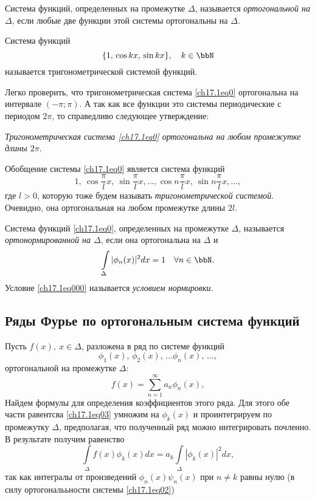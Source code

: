 \begin{defn}
Система функций, определенных на промежутке $\Delta$, называется \textit{ортогональной на $\Delta$}, если любые две функции этой системы ортогональны на $\Delta$.
\end{defn}

\begin{defn}
Система функций 
\begin{equation} \label{ch17.1eq0}
\{1,\, \cos kx,\, \sin kx\}, \quad k\in \bbN
\end{equation}
называется тригонометрической системой функций.			
\end{defn}
Легко проверить, что тригонометрическая система \eqref{ch17.1eq0} ортогональна на интервале $(-\pi;\pi)$. А так как все функции это системы периодические с периодом $2\pi$, то справедливо следующее утверждение:

\textit{Тригонометрическая система \eqref{ch17.1eq0} ортогональна на любом промежутке длины $2\pi$}.	

Обобщение системы \eqref{ch17.1eq0} является система функций
$$
1,\ \cos \frac{\pi}{l}x,\ \sin \frac{\pi}{l}x,\ldots,\cos n\frac{\pi}{l}x,\ \sin n\frac{\pi}{l}x,\ldots,
$$
где $l>0$, которую тоже будем называть \textit{тригонометрической системой}. Очевидно, она ортогональная на любом промежутке длины $2l$.
\begin{defn}
Система функций \eqref{ch17.1eq0}, определенных на промежутке $\Delta$, называется \textit{ортонормированной на $\Delta$}, если она ортогональна на $\Delta$ и 
\begin{equation} \label{ch17.1eq000}
\int \limits_\Delta{|\phi_n(x)|^2dx=1} \quad \forall n \in \bbN.
\end{equation}
Условие \eqref{ch17.1eq000} называется \textit{условием нормировки.}
\end{defn}

\subsection{Ряды Фурье по ортогональным система функций}

Пусть $f(x),\ x \in \Delta$, разложена в ряд по системе функций
\begin{equation} \label{ch17.1eq02}
\phi_1(x), \,\phi_2(x), \, \ldots \phi_n(x), \,\ldots,
\end{equation}
ортогональной на промежутке $\Delta$:
\begin{equation} \label{ch17.1eq03}
f(x)= \sum_{n = 1}^{\infty} a_n \phi_n(x),
\end{equation}
Найдем формулы для определения коэффициентов этого ряда. Для этого обе части равентсва \eqref{ch17.1eq03} умножим на $\phi_k(x)$ и проинтегрируем по промежутку $\Delta$, предполагая, что полученный ряд можно интегрировать почленно. В результате получим равенство
$$
\int \limits_\Delta{f(x) \phi_k(x)}dx=a_k\int \limits_\Delta|\phi_k(x)|^2dx,
$$
так как интегралы от произведений $\phi_n(x)\psi_n(x)$ при $n\ne k$ равны нулю (в силу ортогональьности системы \eqref{ch17.1eq02})

